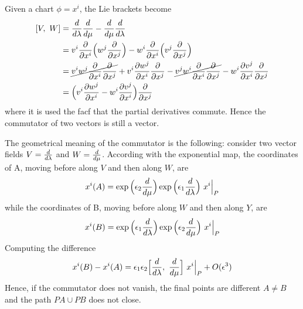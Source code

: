    Given a chart $\phi = x^i$, the Lie brackets become
    \begin{equation*}
    \begin{aligned}
        [V, ~W] & = \dv{}{\lambda} \dv{}{\mu} - \dv{}{\mu} \dv{}{\lambda} \\ & = v^i \pdv{}{x^i} \Big( w^j \pdv{}{x^j} \Big) - w^i \pdv{}{x^i} \Big( v^j \pdv{}{x^j} \Big) \\ & = \cancel{v^i w^j \pdv{}{x^i} \pdv{}{x^j}} + v^i \pdv{w^j}{x^i} \pdv{}{x^j} - \cancel{v^j w^i \pdv{}{x^i} \pdv{}{x^j}} - w^i \pdv{v^j}{x^i} \pdv{}{x^j} \\ & = \Big ( v^i \pdv{w^j}{x^i} - w^i \pdv{v^j}{x^i} \Big ) \pdv{}{x^j} 
    \end{aligned}
    \end{equation*}
    where it is used the facf that the partial derivatives commute. Hence the commutator of two vectors is still a vector. 

    The geometrical meaning of the commutator is the following: consider two vector fields $V = \frac{d}{d\lambda}$ and $W = \frac{d}{d\mu}$. According with the exponential map, the coordinates of A, moving before along $V$ and then along $W$, are 
    \begin{equation*}
        x^i(A) = \exp \Big ( \epsilon_2 \frac{d}{d\mu} \Big) \exp \Big ( \epsilon_1 \frac{d}{d\lambda} \Big) ~ x^i \Big\vert_P
    \end{equation*}
    while the coordinates of B, moving before along $W$ and then along $Y$, are 
    \begin{equation*}
        x^i(B) = \exp \Big ( \epsilon_1 \frac{d}{d\lambda} \Big) \exp \Big ( \epsilon_2 \frac{d}{d\mu} \Big) ~ x^i \Big\vert_P
    \end{equation*}
    Computing the difference
    \begin{equation*}
        x^i(B) - x^i(A) = \epsilon_1 \epsilon_2 \Big [\frac{d}{d\lambda}, ~\frac{d}{d\mu} \Big ] ~ x^i \Big\vert_P + O(\epsilon^3)
    \end{equation*}
    Hence, if the commutator does not vanish, the final points are different $A \neq B$ and the path $PA \cup PB$ does not close. 

